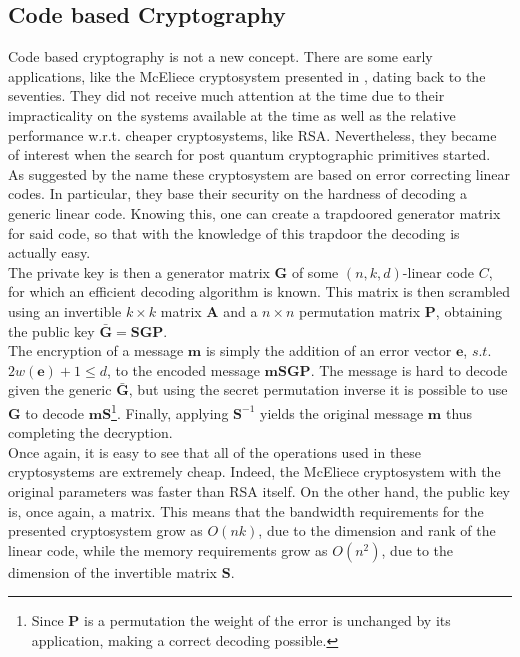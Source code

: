 \subsection{Code based Cryptography}
Code based cryptography is not a new concept. There are some early applications, like the McEliece cryptosystem presented in \cite{mceliece}, dating back to the seventies. They did not receive much attention at the time due to their impracticality on the systems available at the time as well as the relative performance w.r.t. cheaper cryptosystems, like RSA. Nevertheless, they became of interest when the search for post quantum cryptographic primitives started.\\
As suggested by the name these cryptosystem are based on error correcting linear codes. In particular, they base their security on the hardness of decoding a generic linear code. Knowing this, one can create a trapdoored generator matrix for said code, so that with the knowledge of this trapdoor the decoding is actually easy.\\
The private key is then a generator matrix $\mathbf{G}$ of some $(n,k,d)$-linear code $C$, for which an efficient decoding algorithm is known. This matrix is then scrambled using an invertible $k\times k$ matrix $\mathbf{A}$ and a $n\times n$ permutation matrix $\mathbf{P}$, obtaining the public key $\bar{\mathbf{G}}=\mathbf{SGP}$.\\
The encryption of a message $\mathbf{m}$ is simply the addition of an error vector $\mathbf{e}$, $s.t.$ $2w(\mathbf{e})+1\leq d$, to the encoded message $\mathbf{mSGP}$. The message is hard to decode given the generic $\bar{\mathbf{G}}$, but using the secret permutation inverse it is possible to use $\mathbf{G}$ to decode $\mathbf{mS}$\footnote{Since $\mathbf{P}$ is a permutation the weight of the error is unchanged by its application, making a correct decoding possible.}. Finally, applying $\mathbf{S}^{-1}$ yields the original message $\mathbf{m}$ thus completing the decryption.\\
Once again, it is easy to see that all of the operations used in these cryptosystems are extremely cheap. Indeed, the McEliece cryptosystem with the original parameters was faster than RSA itself. On the other hand, the public key is, once again, a matrix. This means that the bandwidth requirements for the presented cryptosystem grow as $O(nk)$, due to the dimension and rank of the linear code, while the memory requirements grow as $O(n^2)$, due to the dimension of the invertible matrix $\mathbf{S}$.

